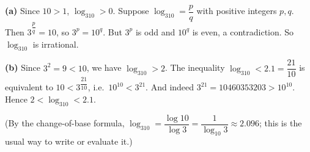 \textbf{(a)} Since $10>1$, $\log_310>0$. Suppose $\log_310=\dfrac {p}{q}$ with positive integers $p,q$. Then $3^{\dfrac {p}{q}}=10$, so $3^p=10^q$. But $3^p$ is odd and $10^q$ is even, a contradiction. So $\log_310$ is irrational.

\textbf{(b)} Since $3^2=9<10$, we have $\log_310>2$. The inequality $\log_310<2.1=\dfrac{21}{10}$ is equivalent to $10<3^{\dfrac{21}{10}}$, i.e.\ $10^{10}<3^{21}$. And indeed $3^{21}=10460353203>10^{10}$. Hence $\boxed{2<\log_310<2.1}$.

(By the change-of-base formula, $\log_310=\dfrac{\log10}{\log3}=\dfrac{1}{\log_{10}3}\approx2.096$; this is the usual way to write or evaluate it.)
